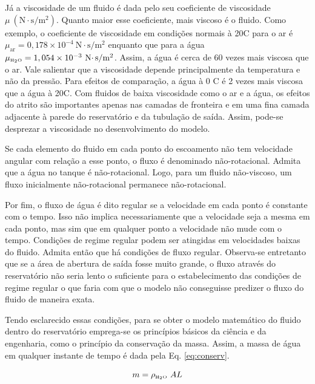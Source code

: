 Já a viscosidade de um fluido é dada pelo seu coeficiente de viscosidade $\mu\
(\text{N}\cdotp \text{s}/\text{m}^2)$. Quanto maior esse coeficiente, mais
viscoso é o fluido. Como exemplo, o coeficiente de viscosidade em condições
normais à 20\textdegree C para o ar é $\mu_{\text{ar}} = 0,178 \times 10^{-4}\
\text{N}\cdotp \text{s}/\text{m}^2$ enquanto que para a água
$\mu_{\tiny \text{\tiny H}_2\text{\tiny O}} = 1,054 \times 10^{-3}\
\text{N}\cdotp \text{s}/\text{m}^2$. Assim, a água é cerca de 60 vezes mais
viscosa que o ar.  Vale salientar que a viscosidade depende principalmente da
temperatura e não da pressão. Para efeitos de comparação, a água à 0\textdegree
C é 2 vezes mais viscosa que a água à 20\textdegree C. Com fluidos de baixa
viscosidade como o ar e a água, os efeitos do atrito são importantes apenas nas
camadas de fronteira e em uma fina camada adjacente à parede do reservatório e
da tubulação de saída.  Assim, pode-se desprezar a viscosidade no
desenvolvimento do modelo.

\Glossary{$\mu_{\text{ar}}$}{Coeficiente de viscosidade do ar}

Se cada elemento do fluido em cada ponto do escoamento não tem velocidade
angular com relação a esse ponto, o fluxo é denominado não-rotacional. Admita
que a água no tanque é não-rotacional. Logo, para um fluido não-viscoso, um
fluxo inicialmente não-rotacional permanece não-rotacional.

Por fim, o fluxo de água é dito regular se a velocidade em cada ponto é
constante com o tempo. Isso não implica necessariamente que a velocidade seja a
mesma em cada ponto, mas sim que em qualquer ponto a velocidade não mude com o
tempo. Condições de regime regular podem ser atingidas em velocidades baixas do
fluido. Admita então que há condições de fluxo regular. Observa-se entretanto
que se a área de abertura de saída fosse muito grande, o fluxo através do
reservatório não seria lento o suficiente para o estabelecimento das
condições de regime regular o que faria com que o modelo não conseguisse
predizer o fluxo do fluido de maneira exata.

Tendo esclarecido essas condições, para se obter o modelo matemático do fluido
dentro do reservatório emprega-se os princípios básicos da ciência e da
engenharia, como o princípio da conservação da massa. Assim, a massa de água em
qualquer instante de tempo é dada pela Eq. \ref{eq:conserv}.

\begin{equation}\label{eq:conserv}
m = \rho_{\tiny \text{\tiny H}_2\text{\tiny O}}\ AL
\end{equation}

